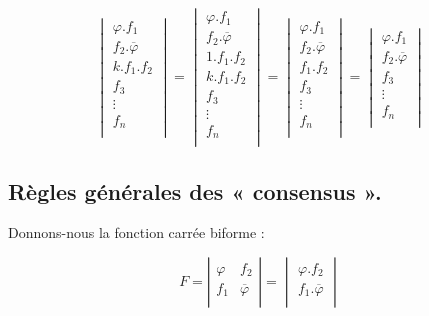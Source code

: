 \[ 
      \begin{vmatrix}
          \varphi . f_1\\ f_2 . \overline{\varphi} \\ k . f_1 . f_2 \\ f_3 \\ \vdots \\ f_n \\
      \end{vmatrix} 
       =   \begin{vmatrix}
                  \varphi . f_1\\ f_2 . \overline{\varphi} \\ 1 . f_1 . f_2 \\  k . f_1 . f_2 \\ f_3 \\ \vdots \\ f_n \\
             \end{vmatrix}
             =   \begin{vmatrix}
                                       \varphi . f_1\\ f_2 . \overline{\varphi} \\  f_1 . f_2 \\  f_3 \\ \vdots \\ f_n \\
                  \end{vmatrix} 
                  =  \begin{vmatrix}
                                       \varphi . f_1\\ f_2 . \overline{\varphi}  \\  f_3 \\ \vdots \\ f_n \\
                    \end{vmatrix} 
\]

\subsection{Règles générales des « consensus ».} Donnons-nous la fonction carrée biforme : 

\[
   F =      \left| \begin{array}{c|c} 
                      \varphi  & f_2 \\
                      f_1 & \overline{\varphi} \\
                   \end{array} \right| 
                                   =
                  \begin{vmatrix}  {\varphi} . f_2  \\
                                f_1 .  \overline{ \varphi}   \\
                  \end{vmatrix}
\]


